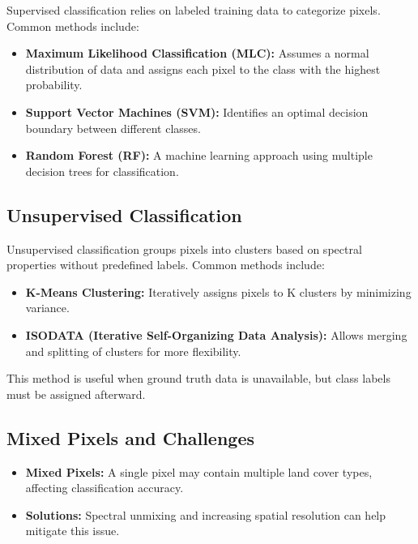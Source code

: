 \documentclass[
  letterpaper,
]{scrbook}
\begin{document}
Supervised classification relies on labeled training data to categorize
pixels. Common methods include:

\begin{itemize}
\item
  \textbf{Maximum Likelihood Classification (MLC):} Assumes a normal
  distribution of data and assigns each pixel to the class with the
  highest probability.
\item
  \textbf{Support Vector Machines (SVM):} Identifies an optimal decision
  boundary between different classes.
\item
  \textbf{Random Forest (RF):} A machine learning approach using
  multiple decision trees for classification.
\end{itemize}

\subsection{\texorpdfstring{\textbf{Unsupervised
Classification}}{Unsupervised Classification}}\label{unsupervised-classification}

Unsupervised classification groups pixels into clusters based on
spectral properties without predefined labels. Common methods include:

\begin{itemize}
\item
  \textbf{K-Means Clustering:} Iteratively assigns pixels to K clusters
  by minimizing variance.
\item
  \textbf{ISODATA (Iterative Self-Organizing Data Analysis):} Allows
  merging and splitting of clusters for more flexibility.
\end{itemize}

This method is useful when ground truth data is unavailable, but class
labels must be assigned afterward.

\subsection{\texorpdfstring{\textbf{Mixed Pixels and
Challenges}}{Mixed Pixels and Challenges}}\label{mixed-pixels-and-challenges}

\begin{itemize}
\item
  \textbf{Mixed Pixels:} A single pixel may contain multiple land cover
  types, affecting classification accuracy.
\item
  \textbf{Solutions:} Spectral unmixing and increasing spatial
  resolution can help mitigate this issue.
\end{itemize}
\end{document}
